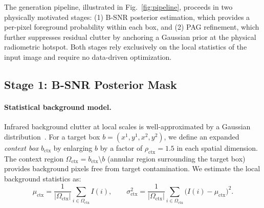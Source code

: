 The generation pipeline, illustrated in Fig.~\ref{fig:pipeline}, proceeds in two
physically motivated stages: (1) B-SNR posterior estimation, which provides
a per-pixel foreground probability within each box, and (2) PAG refinement, which
further suppresses residual clutter by anchoring a Gaussian prior at the physical
radiometric hotspot.
Both stages rely exclusively on the local statistics of the input image and require
no data-driven optimization.

\subsection{Stage 1: B-SNR Posterior Mask}
\label{sec:method_bsnr}

\paragraph{Statistical background model.}
Infrared background clutter at local scales is well-approximated by a Gaussian
distribution~\cite{irstd_survey}.
For a target box $b = (x^1, y^1, x^2, y^2)$, we define an expanded \emph{context box}
$b_\mathrm{ctx}$ by enlarging $b$ by a factor of $\rho_\mathrm{ctx} = 1.5$ in each
spatial dimension.
The context region $\Omega_\mathrm{ctx} = b_\mathrm{ctx} \setminus b$ (annular region
surrounding the target box) provides background pixels free from target contamination.
We estimate the local background statistics as:
\begin{equation}
    \mu_\mathrm{ctx} = \frac{1}{|\Omega_\mathrm{ctx}|} \sum_{i \in \Omega_\mathrm{ctx}} I(i),
    \qquad
    \sigma_\mathrm{ctx}^2 = \frac{1}{|\Omega_\mathrm{ctx}|} \sum_{i \in \Omega_\mathrm{ctx}}
    \bigl(I(i) - \mu_\mathrm{ctx}\bigr)^2.
    \label{eq:bg_stats}
\end{equation}

